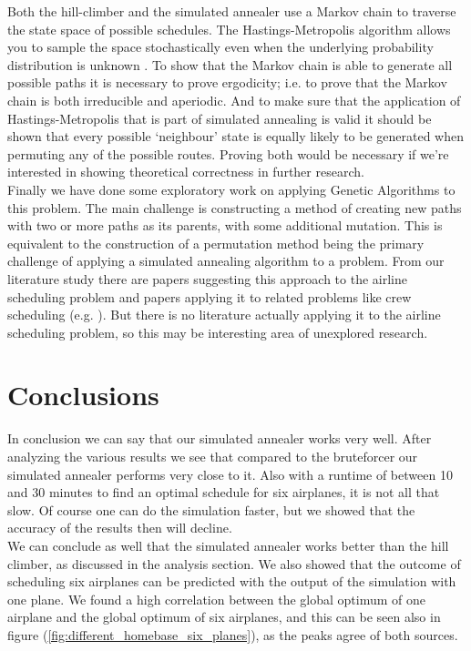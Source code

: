\documentclass[journal]{IEEEtran}
\begin{document}
Both the hill-climber and the simulated annealer use a Markov chain to traverse the state space of possible schedules. The Hastings-Metropolis algorithm allows you to sample the space stochastically even when the underlying probability distribution is unknown \cite{Hasting1970}. To show that the Markov chain is able to generate all possible paths it is necessary to prove ergodicity; i.e. to prove that the Markov chain is both irreducible and aperiodic. And to make sure that the application of Hastings-Metropolis that is part of simulated annealing is valid it should be shown that every possible `neighbour' state is equally likely to be generated when permuting any of the possible routes. Proving both would be necessary if we're interested in showing theoretical correctness in further research. \\
Finally we have done some exploratory work on applying Genetic Algorithms to this problem. The main challenge is constructing a method of creating new paths with two or more paths as its parents, with some additional mutation. This is equivalent to the construction of a permutation method being the primary challenge of applying a simulated annealing algorithm to a problem. From our literature study there are papers suggesting this approach to the airline scheduling problem and papers applying it to related problems like crew scheduling  (e.g. \cite{Levine1996}). But there is no literature actually applying it to the airline scheduling problem, so this may be interesting area of unexplored research.




\section{Conclusions}
In conclusion we can say that our simulated annealer works very well. After analyzing the various results we see that compared to the bruteforcer our simulated annealer performs very close to it. Also with a runtime of between 10 and 30 minutes to find an optimal schedule for six airplanes, it is not all that slow. Of course one can do the simulation faster, but we showed that the accuracy of the results then will decline.\\
We can conclude as well that the simulated annealer works better than the hill climber, as discussed in the analysis section. We also showed that the outcome of scheduling six airplanes can be predicted with the output of the simulation with one plane. We found a high correlation between the global optimum of one airplane and the global optimum of six airplanes, and this can be seen also in figure (\ref{fig:different_homebase_six_planes}), as the peaks agree of both sources.


\end{document}
